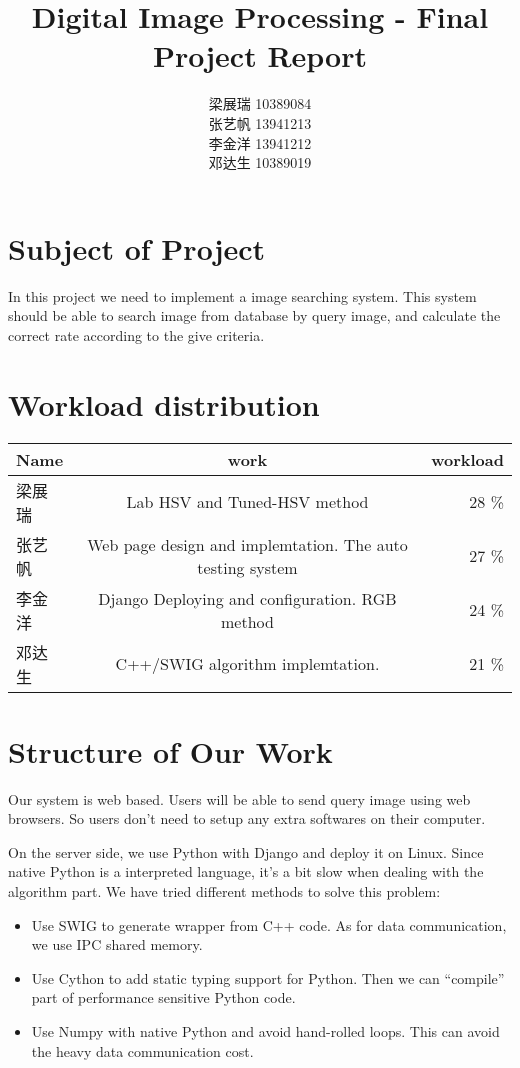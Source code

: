 \documentclass[11pt,a4paper]{article}
\begin{document}
\title{\bfseries Digital Image Processing - Final Project Report}
\author{
 梁展瑞 \hspace{24pt} 10389084 \\
 张艺帆 \hspace{24pt} 13941213\\
 李金洋  \hspace{24pt} 13941212\\
 邓达生  \hspace{24pt} 10389019
}
\maketitle

\tableofcontents

\section{Subject of Project}
In this project we need to implement a image searching system. This system should be 
able to search image from database by query image, and calculate the correct rate
according to the give criteria.

\section{Workload distribution}
\begin{tabular}[h]{|l|c|r|}
    Name & work & workload \\
    \hline
    梁展瑞 & Lab HSV and Tuned-HSV method & 28 \% \\
    张艺帆 & Web page design and implemtation. The auto testing system & 27 \% \\
    李金洋 & Django Deploying and configuration. RGB method & 24 \%\\
    邓达生 & C++/SWIG algorithm implemtation. & 21 \% \\
\end{tabular}


\section{Structure of Our Work}
Our system is web based. Users will be able to send query image using web browsers. So users
don't need to setup any extra softwares on their computer.

On the server side, we use Python with Django and deploy it on Linux. Since native Python is a interpreted language, it's a bit
slow when dealing with the algorithm part. We have tried different methods to solve this problem:
\begin{itemize}
    \item Use SWIG to generate wrapper from C++ code. As for data communication, we use IPC shared memory.
    \item Use Cython to add static typing support for Python. Then we can ``compile'' part of performance sensitive Python code.
    \item Use Numpy with native Python and avoid hand-rolled loops. This can avoid the heavy data communication cost.
\end{itemize}
\end{document}
